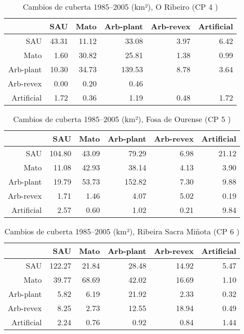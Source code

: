 \begin{table}[p]
\centering
\caption{Cambios de cuberta 1985--2005 (km²), O Ribeiro (CP 4 )} 
\label{TaboaContinxCP4}
\begin{tabular}{rrrrrr}
  \hline
 & SAU & Mato & Arb-plant & Arb-revex & Artificial \\ 
  \hline
SAU & 43.31 & 11.12 & 33.08 & 3.97 & 6.42 \\ 
  Mato & 1.60 & 30.82 & 25.81 & 1.38 & 0.99 \\ 
  Arb-plant & 10.30 & 34.73 & 139.53 & 8.78 & 3.64 \\ 
  Arb-revex & 0.00 & 0.20 & 0.46 &  &  \\ 
  Artificial & 1.72 & 0.36 & 1.19 & 0.48 & 1.72 \\ 
   \hline
\end{tabular}
\end{table}
\begin{table}[p]
\centering
\caption{Cambios de cuberta 1985--2005 (km²), Fosa de Ourense (CP 5 )} 
\label{TaboaContinxCP5}
\begin{tabular}{rrrrrr}
  \hline
 & SAU & Mato & Arb-plant & Arb-revex & Artificial \\ 
  \hline
SAU & 104.80 & 43.09 & 79.29 & 6.98 & 21.12 \\ 
  Mato & 11.08 & 42.93 & 38.14 & 4.13 & 3.90 \\ 
  Arb-plant & 19.79 & 53.73 & 152.82 & 7.30 & 9.88 \\ 
  Arb-revex & 1.71 & 1.46 & 4.07 & 5.02 & 0.19 \\ 
  Artificial & 2.57 & 0.60 & 1.02 & 0.21 & 9.84 \\ 
   \hline
\end{tabular}
\end{table}
\begin{table}[p]
\centering
\caption{Cambios de cuberta 1985--2005 (km²), Ribeira Sacra Miñota (CP 6 )} 
\label{TaboaContinxCP6}
\begin{tabular}{rrrrrr}
  \hline
 & SAU & Mato & Arb-plant & Arb-revex & Artificial \\ 
  \hline
SAU & 122.27 & 21.84 & 28.48 & 14.92 & 5.47 \\ 
  Mato & 39.77 & 68.69 & 42.02 & 16.69 & 1.10 \\ 
  Arb-plant & 5.82 & 6.19 & 21.92 & 2.33 & 0.32 \\ 
  Arb-revex & 8.25 & 2.73 & 12.55 & 18.94 & 0.49 \\ 
  Artificial & 2.24 & 0.76 & 0.92 & 0.84 & 1.44 \\ 
   \hline
\end{tabular}
\end{table}
